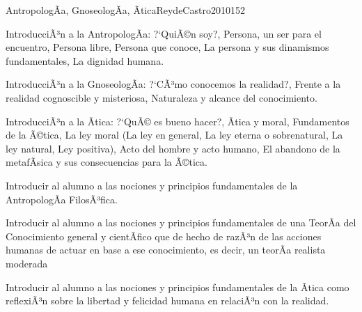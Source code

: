 \begin{syllabus}
\begin{unit}{AntropologÃ­a, GnoseologÃ­a, Ãtica}{ReydeCastro2010}{15}{2}
\begin{topics}
	\item IntroducciÃ³n a la AntropologÃ­a: ?`QuiÃ©n soy?, Persona, un ser para el encuentro, Persona libre, Persona que conoce, La persona y sus dinamismos fundamentales, La dignidad humana.
	\item IntroducciÃ³n a la GnoseologÃ­a: ?`CÃ³mo conocemos la realidad?, Frente a la realidad cognoscible y misteriosa, Naturaleza y alcance del conocimiento.
	\item IntroducciÃ³n a la Ãtica: ?`QuÃ© es bueno hacer?, Ãtica y moral, Fundamentos de la Ã©tica, La ley moral (La ley en general, La ley eterna o sobrenatural, La ley natural, Ley positiva), Acto del hombre y acto humano, El abandono de la metafÃ­sica y sus consecuencias para la Ã©tica.
\end{topics}

\begin{unitgoals}
	\item Introducir al alumno a las nociones y principios fundamentales de la AntropologÃ­a FilosÃ³fica.
	\item Introducir al alumno a las nociones y principios fundamentales de una TeorÃ­a del Conocimiento general y cientÃ­fico que de hecho de razÃ³n de las acciones humanas de actuar en base a ese conocimiento, es decir, un teorÃ­a realista moderada
	\item Introducir al alumno a las nociones y principios fundamentales de la Ãtica como reflexiÃ³n sobre la libertad y felicidad humana en relaciÃ³n con la realidad.
\end{unitgoals}
\end{unit}


\end{syllabus}

